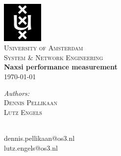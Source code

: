 \documentclass{article}
\begin{document}
\begin{titlepage}
\begin{center}
\includegraphics[width=0.15\textwidth]{images/uva-logo.png}\\[1cm]
\textsc{\LARGE University of Amsterdam}\\[0.5cm]
\textsc{\Large System \& Network Engineering}\\[2cm]
{\huge \bfseries Naxsi performance measurement}\\[0.2cm]
{\large \today}\\
\end{center}
\vfill
\begin{minipage}[t]{0.4\textwidth}
\begin{flushleft} \large
\emph{Authors:}\\
\textsc{Dennis Pellikaan}\\
\textsc{Lutz Engels}\\[1cm]
\end{flushleft}
\end{minipage}
\begin{minipage}[t]{0.4\textwidth}
\begin{flushright} \large
\mbox{ }\\
dennis.pellikaan@os3.nl\\
lutz.engels@os3.nl\\
\end{flushright}
\end{minipage}
\end{titlepage}

\pagestyle{empty}

\newpage
\tableofcontents
\newpage
\pagestyle{plain}
\setcounter{page}{1}







\appendix





%
\end{document}
